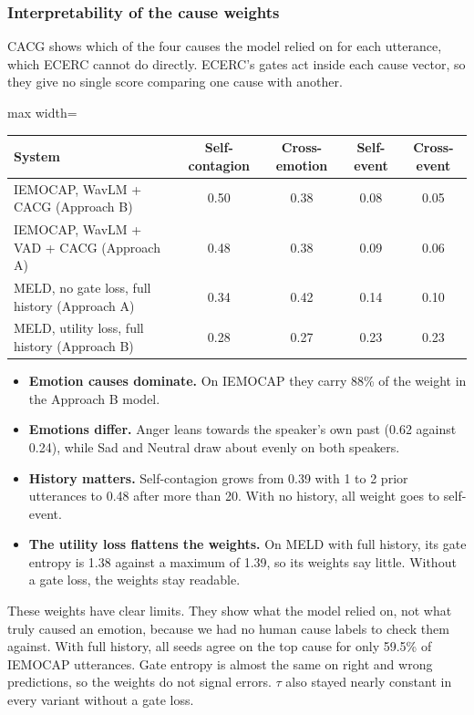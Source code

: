 \documentclass[11pt,a4paper]{article}
\begin{document}
\subsubsection{Interpretability of the cause weights}

CACG shows which of the four causes the model relied on for each utterance, which ECERC cannot do directly. ECERC's gates act inside each cause vector, so they give no single score comparing one cause with another.

\begin{center}
\begin{adjustbox}{max width=\linewidth}
\begin{tabular}{lcccc}
\toprule
System & Self-contagion & Cross-emotion & Self-event & Cross-event \\
\midrule
IEMOCAP, WavLM + CACG (Approach B) & 0.50 & 0.38 & 0.08 & 0.05 \\
IEMOCAP, WavLM + VAD + CACG (Approach A) & 0.48 & 0.38 & 0.09 & 0.06 \\
MELD, no gate loss, full history (Approach A) & 0.34 & 0.42 & 0.14 & 0.10 \\
MELD, utility loss, full history (Approach B) & 0.28 & 0.27 & 0.23 & 0.23 \\
\bottomrule
\end{tabular}
\end{adjustbox}
\end{center}

\begin{itemize}
  \item \textbf{Emotion causes dominate.} On IEMOCAP they carry 88\% of the weight in the Approach B model.
  \item \textbf{Emotions differ.} Anger leans towards the speaker's own past (0.62 against 0.24), while Sad and Neutral draw about evenly on both speakers.
  \item \textbf{History matters.} Self-contagion grows from 0.39 with 1 to 2 prior utterances to 0.48 after more than 20. With no history, all weight goes to self-event.
  \item \textbf{The utility loss flattens the weights.} On MELD with full history, its gate entropy is 1.38 against a maximum of 1.39, so its weights say little. Without a gate loss, the weights stay readable.
\end{itemize}

These weights have clear limits. They show what the model relied on, not what truly caused an emotion, because we had no human cause labels to check them against. With full history, all seeds agree on the top cause for only 59.5\% of IEMOCAP utterances. Gate entropy is almost the same on right and wrong predictions, so the weights do not signal errors. $\tau$ also stayed nearly constant in every variant without a gate loss.
\end{document}
